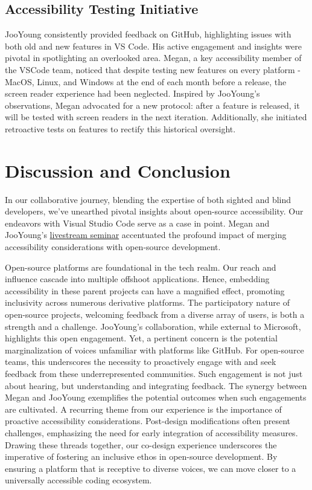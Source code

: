 \documentclass[sigconf]{acmart}
\begin{document}
\hypertarget{accessibility-testing-initiative}{%
\subsection{Accessibility Testing
Initiative}\label{accessibility-testing-initiative}}

JooYoung consistently provided feedback on GitHub, highlighting issues
with both old and new features in VS Code. His active engagement and
insights were pivotal in spotlighting an overlooked area. Megan, a key
accessibility member of the VSCode team, noticed that despite testing
new features on every platform - MacOS, Linux, and Windows at the end of
each month before a release, the screen reader experience had been
neglected. Inspired by JooYoung's observations, Megan advocated for a
new protocol: after a feature is released, it will be tested with screen
readers in the next iteration. Additionally, she initiated retroactive
tests on features to rectify this historical oversight.

\hypertarget{discussion-and-conclusion}{%
\section{Discussion and Conclusion}\label{discussion-and-conclusion}}

In our collaborative journey, blending the expertise of both sighted and
blind developers, we've unearthed pivotal insights about open-source
accessibility. Our endeavors with Visual Studio Code serve as a case in
point. Megan and JooYoung's
\href{https://learn.microsoft.com/en-us/events/vs-code-day-2023/accessibilty-in-vs-code}{livestream
seminar} accentuated the profound impact of merging accessibility
considerations with open-source development.

Open-source platforms are foundational in the tech realm. Our reach and
influence cascade into multiple offshoot applications. Hence, embedding
accessibility in these parent projects can have a magnified effect,
promoting inclusivity across numerous derivative platforms. The
participatory nature of open-source projects, welcoming feedback from a
diverse array of users, is both a strength and a challenge. JooYoung's
collaboration, while external to Microsoft, highlights this open
engagement. Yet, a pertinent concern is the potential marginalization of
voices unfamiliar with platforms like GitHub. For open-source teams,
this underscores the necessity to proactively engage with and seek
feedback from these underrepresented communities. Such engagement is not
just about hearing, but understanding and integrating feedback. The
synergy between Megan and JooYoung exemplifies the potential outcomes
when such engagements are cultivated. A recurring theme from our
experience is the importance of proactive accessibility considerations.
Post-design modifications often present challenges, emphasizing the need
for early integration of accessibility measures. Drawing these threads
together, our co-design experience underscores the imperative of
fostering an inclusive ethos in open-source development. By ensuring a
platform that is receptive to diverse voices, we can move closer to a
universally accessible coding ecosystem.
\end{document}
